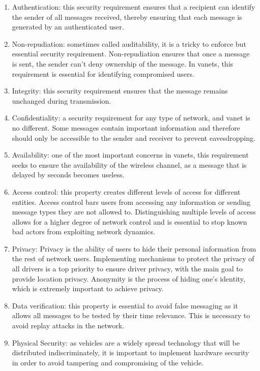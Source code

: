 \begin{enumerate}
	\item Authentication: this security requirement ensures that a recipient can identify the sender of all messages received, thereby ensuring that each message is generated by an authenticated user.
    \item Non-repudiation: sometimes called auditability, it is a tricky to enforce but essential security requirement. Non-repudiation ensures that once a message is sent, the sender can't deny ownership of the message. In \glspl{vanet}, this requirement is essential for identifying compromised users.
    \item Integrity: this security requirement ensures that the message remains unchanged during transmission.
	\item Confidentiality: a security requirement for any type of network, and \gls{vanet} is no different. Some messages contain important information and therefore should only be accessible to the sender and receiver to prevent eavesdropping.
	\item Availability: one of the most important concerns in \glspl{vanet}, this requirement seeks to ensure the availability of the wireless channel, as a message that is delayed by seconds becomes useless.
	\item Access control: this property creates different levels of access for different entities. Access control bars users from accessing any information or sending message types they are not allowed to. Distinguishing multiple levels of access allows for a higher degree of network control and is essential to stop known bad actors from exploiting network dynamics.
	\item Privacy: Privacy is the ability of users to hide their personal information from the rest of network users. Implementing mechanisms to protect the privacy of all drivers is a top priority to ensure driver privacy, with the main goal to provide location privacy. Anonymity is the process of hiding one's identity, which is extremely important to achieve privacy.
	\item Data verification: this property is essential to avoid false messaging as it allows all messages to be tested by their time relevance. This is necessary to avoid replay attacks in the network.
	\item Physical Security: as vehicles are a widely spread technology that will be distributed indiscriminately, it is important to implement hardware security in order to avoid tampering and compromising of the vehicle.
\end{enumerate}

